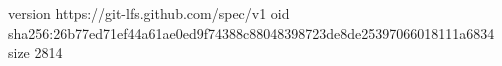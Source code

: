 version https://git-lfs.github.com/spec/v1
oid sha256:26b77ed71ef44a61ae0ed9f74388c88048398723de8de25397066018111a6834
size 2814
